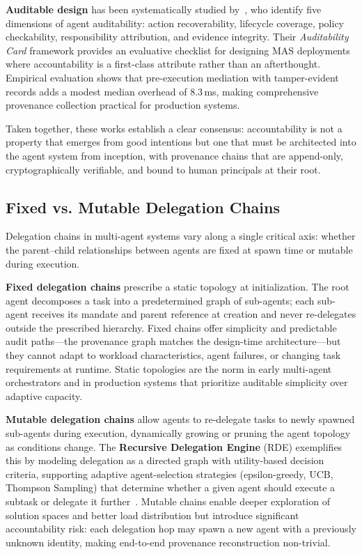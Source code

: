 \textbf{Auditable design} has been systematically studied by~\cite{auditability2025}, who identify five dimensions of agent auditability: action recoverability, lifecycle coverage, policy checkability, responsibility attribution, and evidence integrity. Their \emph{Auditability Card} framework provides an evaluative checklist for designing MAS deployments where accountability is a first-class attribute rather than an afterthought. Empirical evaluation shows that pre-execution mediation with tamper-evident records adds a modest median overhead of 8.3\,ms, making comprehensive provenance collection practical for production systems.

Taken together, these works establish a clear consensus: accountability is not a property that emerges from good intentions but one that must be architected into the agent system from inception, with provenance chains that are append-only, cryptographically verifiable, and bound to human principals at their root.

\subsection{Fixed vs. Mutable Delegation Chains}
\label{sec:delegation-chains}

Delegation chains in multi-agent systems vary along a single critical axis: whether the parent--child relationships between agents are fixed at spawn time or mutable during execution.

\textbf{Fixed delegation chains} prescribe a static topology at initialization. The root agent decomposes a task into a predetermined graph of sub-agents; each sub-agent receives its mandate and parent reference at creation and never re-delegates outside the prescribed hierarchy. Fixed chains offer simplicity and predictable audit paths---the provenance graph matches the design-time architecture---but they cannot adapt to workload characteristics, agent failures, or changing task requirements at runtime. Static topologies are the norm in early multi-agent orchestrators and in production systems that prioritize auditable simplicity over adaptive capacity.

\textbf{Mutable delegation chains} allow agents to re-delegate tasks to newly spawned sub-agents during execution, dynamically growing or pruning the agent topology as conditions change. The \textbf{Recursive Delegation Engine} (RDE) exemplifies this by modeling delegation as a directed graph with utility-based decision criteria, supporting adaptive agent-selection strategies (epsilon-greedy, UCB, Thompson Sampling) that determine whether a given agent should execute a subtask or delegate it further~\cite{rde2025}. Mutable chains enable deeper exploration of solution spaces and better load distribution but introduce significant accountability risk: each delegation hop may spawn a new agent with a previously unknown identity, making end-to-end provenance reconstruction non-trivial.

